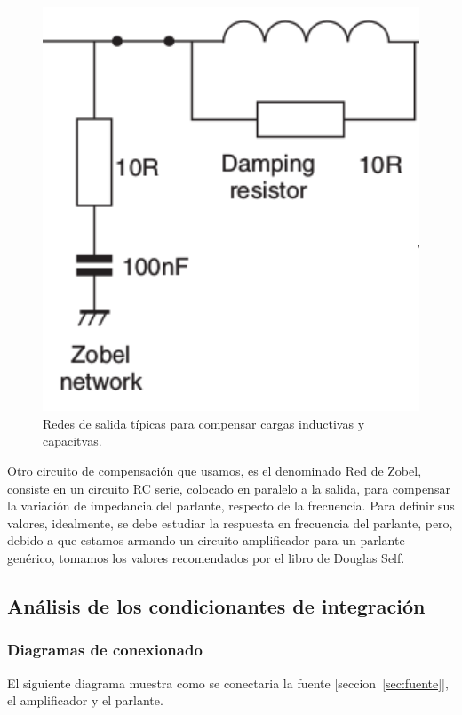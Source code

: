 \documentclass[a4paper,12pt,twoside]{article}
\begin{document}
\begin{figure}[H]
\centering
\includegraphics[width=1\textwidth]{img/output-networks}
\caption{Redes de salida típicas para compensar cargas inductivas y capacitvas.}
\label{fig:output-networks} 
\end{figure}


Otro circuito de compensación que usamos, es el denominado Red de Zobel, consiste en un circuito RC serie, colocado en paralelo a la salida, para compensar la variación de impedancia del parlante, respecto de la frecuencia. Para definir sus valores, idealmente, se debe estudiar la respuesta en frecuencia del parlante, pero, debido a que estamos armando un circuito amplificador para un parlante genérico, tomamos los valores recomendados por el libro de Douglas Self. 

\subsection{Análisis de los condicionantes de integración}

\subsubsection{Diagramas de conexionado}
El siguiente diagrama muestra como se conectaria la fuente [seccion~\ref{sec:fuente}], el amplificador y el parlante.
\end{document}
